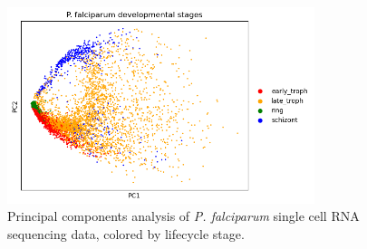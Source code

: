 \documentclass{article}
\begin{document}
\begin{figure}[H]
	\centering
  \includegraphics[width=0.8\textwidth]{figures/pca_Pf.png}
  \caption{Principal components analysis of \textit{P. falciparum} single cell RNA sequencing data, colored by lifecycle stage.}
  \label{fig:pfal_pca_true}
\end{figure}
\end{document}
